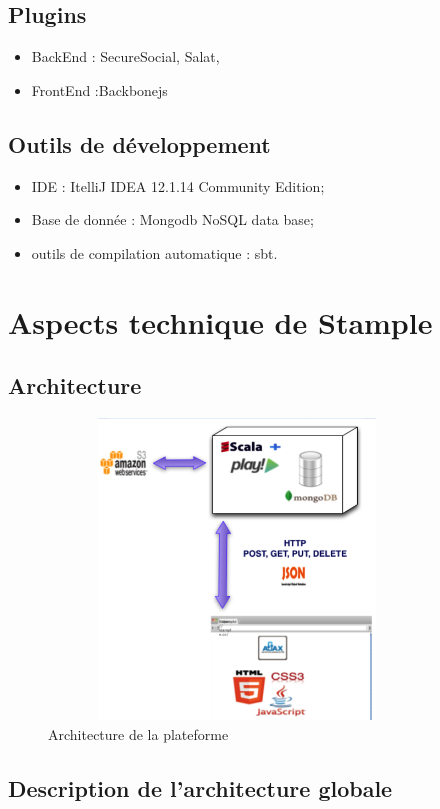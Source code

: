 \subsection{Plugins}
\begin{itemize}
\item BackEnd : SecureSocial, Salat,
\item FrontEnd :Backbonejs 
\end{itemize}
\subsection{Outils de développement}
\begin{itemize}
\item IDE : ItelliJ IDEA 12.1.14 Community Edition;
\item Base de donnée : Mongodb NoSQL data base;
\item outils de compilation automatique : sbt.
\end{itemize}
\section{Aspects technique de Stample}
\subsection{Architecture}
\begin{figure}[H]
        \centering
                \centering
                \includegraphics[width=10cm,height=8cm]{architectureStample.png}
                \caption{Architecture de la plateforme}
                \label{fig:Architecture de la plateforme}
       
\end{figure}
\subsection{Description de l'architecture globale}
